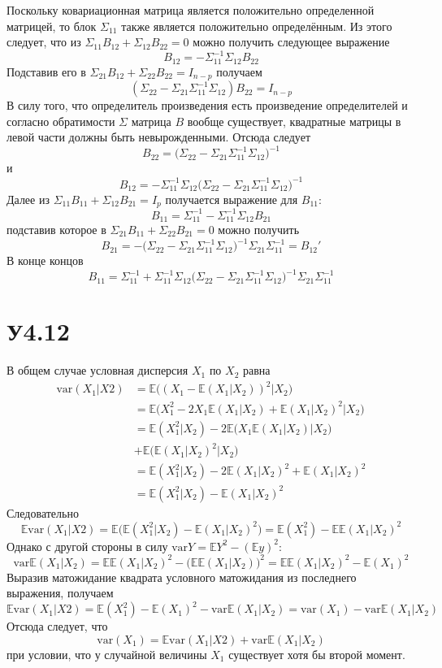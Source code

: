 \documentclass[a4paper]{article}
\newcommand{\ex}[0]{{\mathbb{E}}}
\newcommand{\var}[0]{\text{var}}
\begin{document}
Поскольку ковариационная матрица является положительно определенной матрицей,
то блок $\Sigma_{11}$ также является положительно определённым. Из этого следует,
что из $\Sigma_{11}B_{12} + \Sigma_{12}B_{22}=0$ можно получить следующее выражение
\[B_{12} = -\Sigma_{11}^{-1} \Sigma_{12}B_{22}\]
Подставив его в $\Sigma_{21}B_{12} + \Sigma_{22}B_{22} = I_{n-p}$ получаем
\[
( \Sigma_{22} - \Sigma_{21}\Sigma_{11}^{-1} \Sigma_{12} ) B_{22} = I_{n-p}
\]
В силу того, что определитель произведения есть произведение определителей
и согласно обратимости $\Sigma$ матрица $B$ вообще существует, квадратные
матрицы в левой части должны быть невырожденными. Отсюда следует
\[
B_{22} = \bigl( \Sigma_{22} - \Sigma_{21}\Sigma_{11}^{-1} \Sigma_{12} \bigr)^{-1}
\]
и
\[
B_{12} = -\Sigma_{11}^{-1} \Sigma_{12} \bigl( \Sigma_{22} - \Sigma_{21}\Sigma_{11}^{-1} \Sigma_{12} \bigr)^{-1}
\]
Далее из $\Sigma_{11}B_{11} + \Sigma_{12}B_{21} = I_p$ получается выражение для $B_{11}$:
\[ B_{11} = \Sigma_{11}^{-1} - \Sigma_{11}^{-1}\Sigma_{12}B_{21}\]
подставив которое в $\Sigma_{21}B_{11} + \Sigma_{22}B_{21}=0$ можно получить
\[ 
B_{21}
= - \bigl(\Sigma_{22} - \Sigma_{21}\Sigma_{11}^{-1}\Sigma_{12} \bigr)^{-1} \Sigma_{21}\Sigma_{11}^{-1}
= B_{12}'
\]
В конце концов
\[
B_{11}
= \Sigma_{11}^{-1} + \Sigma_{11}^{-1}\Sigma_{12}
		\bigl(\Sigma_{22} - \Sigma_{21}\Sigma_{11}^{-1}\Sigma_{12} \bigr)^{-1}
	\Sigma_{21}\Sigma_{11}^{-1}
\]


\section{У4.12} %
\label{sec:problem_4_12}

В общем случае условная дисперсия $X_1$ по $X_2$ равна
\begin{align*}
	\var(X_1 \lvert X2)
	&= \ex\bigl( (X_1 - \ex(X_1 \lvert X_2))^2 \big\lvert X_2\bigr) \\
	&= \ex\bigl( X_1^2 - 2 X_1\ex(X_1 \lvert X_2) + \ex(X_1 \lvert X_2)^2 \big\lvert X_2\bigr) \\
	&= \ex( X_1^2 \lvert X_2) - 2 \ex\bigl( X_1 \ex(X_1 \lvert X_2) \big\lvert X_2\bigr) \\
		&+ \ex\bigl( \ex(X_1 \lvert X_2)^2 \big\lvert X_2\bigr) \\
	&= \ex( X_1^2 \lvert X_2) - 2 \ex(X_1 \lvert X_2)^2 + \ex(X_1 \lvert X_2)^2 \\
	&= \ex( X_1^2 \lvert X_2) - \ex(X_1 \lvert X_2)^2
\end{align*}
Следовательно
\[
\ex \var(X_1 \lvert X2)
= \ex\bigl( \ex( X_1^2 \lvert X_2) - \ex(X_1 \lvert X_2)^2 \bigr)
= \ex(X_1^2) - \ex \ex(X_1 \lvert X_2)^2
\]
Однако с другой стороны в силу $\var{Y} = \ex Y^2 - (\ex y )^2$:
\[
\var \ex(X_1 \lvert X_2)
= \ex \ex(X_1 \lvert X_2)^2 - \bigl(\ex \ex(X_1 \lvert X_2)\bigr)^2
= \ex \ex(X_1 \lvert X_2)^2 - \ex(X_1)^2
\]
Выразив матожидание квадрата условного матожидания из последнего выражения, получаем
\[
\ex \var(X_1 \lvert X2)
= \ex(X_1^2) - \ex(X_1)^2 - \var \ex(X_1 \lvert X_2)
= \var(X_1) - \var \ex(X_1 \lvert X_2)
\]
Отсюда следует, что
\[\var(X_1) = \ex \var(X_1 \lvert X2) + \var \ex(X_1 \lvert X_2)\]
при условии, что у случайной величины $X_1$ существует хотя бы второй момент.
\end{document}
